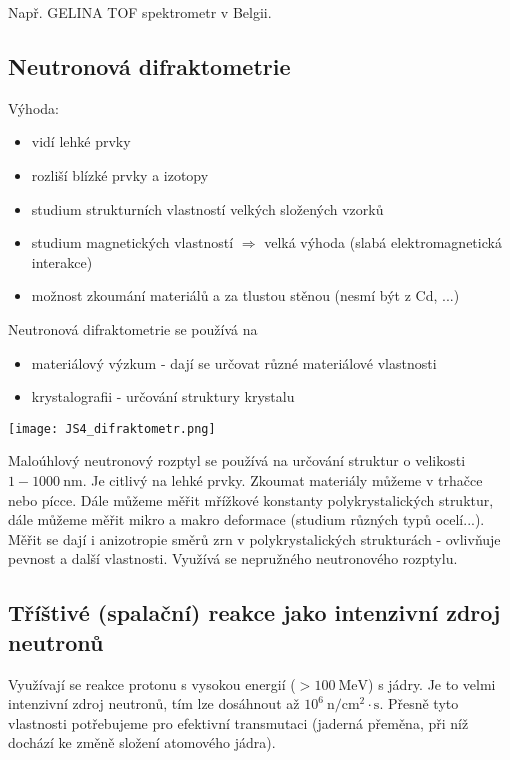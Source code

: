 \documentclass[../../main.tex]{subfiles}
\begin{document}
Např. GELINA TOF spektrometr v Belgii.

\subsection{Neutronová difraktometrie}

Výhoda: 
\begin{itemize}
	\item vidí lehké prvky
	\item rozliší blízké prvky a izotopy
	\item studium strukturních vlastností velkých složených vzorků
	\item studium magnetických vlastností $\Rightarrow$ velká výhoda (slabá elektromagnetická interakce)
	\item možnost zkoumání materiálů a za tlustou stěnou (nesmí být z Cd, ...)	
\end{itemize}	

Neutronová difraktometrie se používá na 
\begin{itemize}
	\item materiálový výzkum - dají se určovat různé materiálové vlastnosti
	\item krystalografii - určování struktury krystalu
\end{itemize}

\begin{center}
	\texttt{[image: JS4\_difraktometr.png]}
\end{center}

Maloúhlový neutronový rozptyl se používá na určování struktur o velikosti $1 - 1000 ~\mathrm{nm}$. Je citlivý na lehké prvky. Zkoumat materiály můžeme v trhačce nebo pícce. Dále můžeme měřit mřížkové konstanty polykrystalických struktur, dále můžeme měřit mikro a makro deformace (studium různých typů ocelí...). Měřit se dají i anizotropie směrů zrn v polykrystalických strukturách - ovlivňuje pevnost a další vlastnosti. Využívá se nepružného neutronového rozptylu.

\subsection{Tříštivé (spalační) reakce jako intenzivní zdroj neutronů}

Využívají se reakce protonu s vysokou energií ($> 100 ~\mathrm{MeV}$) s jádry. Je to velmi intenzivní zdroj neutronů, tím lze dosáhnout až $10^6 ~\mathrm{n/cm^2 \cdotp s}$. Přesně tyto vlastnosti potřebujeme pro efektivní transmutaci (jaderná přeměna, při níž dochází ke změně složení atomového jádra). 
\end{document}

